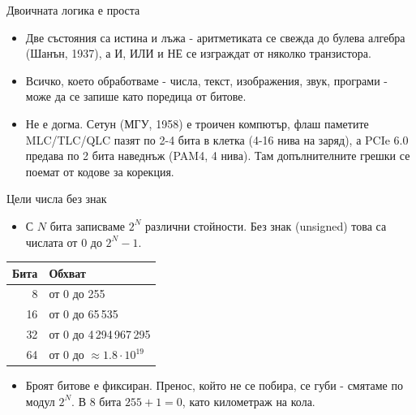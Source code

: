 \documentclass[14pt, aspectratio=169]{beamer}
\begin{document}
\begin{frame}{Двоичната логика е проста}
  \begin{itemize}
    \item Две състояния са истина и лъжа - аритметиката се свежда до булева
      алгебра (Шанън, 1937), а И, ИЛИ и НЕ се изграждат от няколко транзистора.
    \item Всичко, което обработваме - числа, текст, изображения, звук,
      програми - може да се запише като поредица от битове.
    \item Не е догма. Сетун (МГУ, 1958) е троичен компютър, флаш паметите
      MLC/TLC/QLC пазят по 2-4 бита в клетка (4-16 нива на заряд), а PCIe 6.0
      предава по 2 бита наведнъж (PAM4, 4 нива). Там допълнителните грешки се
      поемат от кодове за корекция.
  \end{itemize}
\end{frame}

\begin{frame}{Цели числа без знак}
  \begin{itemize}
    \item С $N$ бита записваме $2^N$ различни стойности. Без знак (unsigned)
      това са числата от $0$ до $2^N - 1$.
  \end{itemize}
  \begin{center}
    \small
    \begin{tabular}{@{}rl@{}}
      \toprule
      \textbf{Бита} & \textbf{Обхват} \\
      \midrule
      8 & от 0 до 255 \\
      16 & от 0 до 65\,535 \\
      32 & от 0 до 4\,294\,967\,295 \\
      64 & от 0 до $\approx 1.8 \cdot 10^{19}$ \\
      \bottomrule
    \end{tabular}
  \end{center}
  \begin{itemize}
    \item Броят битове е фиксиран. Пренос, който не се побира, се губи -
      смятаме по модул $2^N$. В 8 бита $255 + 1 = 0$, като километраж на кола.
  \end{itemize}
\end{frame}
\end{document}
